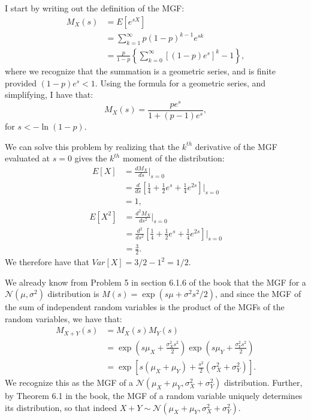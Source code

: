 \begin{problem}{6} I start by writing out the definition of the MGF:
\begin{align*}
M_X(s) & = E[e^{sX}] \\
& = \sum_{k=1}^\infty p(1-p)^{k-1} e^{sk}\\
&= \frac{p}{1-p}\left  \{\sum_{k=0}^\infty[(1-p)e^{s}]^k-1\right \},
\end{align*}
where we recognize that the summation is a geometric series, and is finite provided $(1-p)e^{s}<1$.  Using the formula for a geometric series, and simplifying, I have that:
\begin{equation*}
M_X(s) =\frac{pe^{s}}{1+(p-1)e^s},
\end{equation*}
for $s< -\ln(1-p).$


\end{problem}

\begin{problem}{7}  We can solve this problem by realizing that the $k^{th}$ derivative of the MGF evaluated at $s=0$ gives the $k^{th}$ moment of the distribution:
\begin{align*}
E[X] &= \frac{dM_X}{ds}\Big |_{s=0} \\
&= \frac{d}{ds} \left [ \frac{1}{4}+\frac{1}{2}e^s+\frac{1}{4}e^{2s} \right] \bigg |_{s=0}  \\
& = 1,
\end{align*}
\begin{align*}
E[X^2] &= \frac{d^2M_X}{ds^2}\Big |_{s=0} \\
&= \frac{d^2}{ds^2} \left [ \frac{1}{4}+\frac{1}{2}e^s+\frac{1}{4}e^{2s} \right] \bigg |_{s=0}  \\
& = \frac{3}{2}.
\end{align*}
We therefore have that $Var[X] = 3/2-1^2 = 1/2.$

\end{problem}

\begin{problem}{8}  We already know from Problem 5 in section 6.1.6 of the book that the MGF for a $\mathcal N(\mu, \sigma^2)$ distribution is $M(s) = \exp ( s\mu +\sigma^2 s^2/2 )$, and since the MGF of the sum of independent random variables is the product of the MGFs of the random variables, we have that:
\begin{align*}
M_{X+Y}(s) &= M_X(s)M_Y(s) \\
&=\exp \left(s\mu_X+\frac{\sigma_X^2 s^2}{2} \right)\exp \left(s\mu_Y+\frac{\sigma_Y^2 s^2}{2} \right) \\
& = \exp \left[s(\mu_X+\mu_Y)+\frac{s^2}{2}(\sigma_X^2+\sigma_Y^2) \right].
\end{align*}
We recognize this as the MGF of a $\mathcal N(\mu_X+\mu_Y, \sigma_X^2+\sigma_Y^2)$ distribution.  Further, by Theorem 6.1 in the book, the MGF of a random variable uniquely determines its distribution, so that indeed $X+Y \sim \mathcal N(\mu_X+\mu_Y, \sigma_X^2+ \sigma_Y^2)$.

\end{problem}


